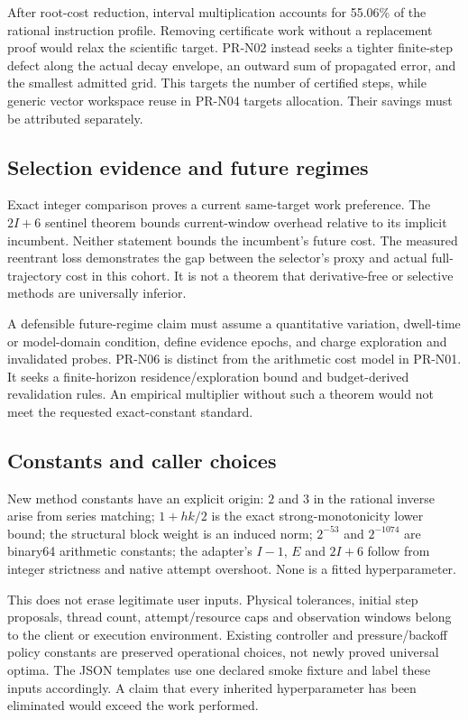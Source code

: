 \documentclass[aps,pra,reprint,onecolumn,12pt,notitlepage,superscriptaddress,nofootinbib]{revtex4-2}
\begin{document}
After root-cost reduction, interval multiplication accounts for 55.06\%
of the rational instruction profile. Removing certificate work without a
replacement proof would relax the scientific target. PR-N02 instead seeks
a tighter finite-step defect along the actual decay envelope, an outward
sum of propagated error, and the smallest admitted grid. This targets
the number of certified steps, while generic vector workspace reuse in
PR-N04 targets allocation. Their savings must be attributed separately.

\subsection{Selection evidence and future regimes}
Exact integer comparison proves a current same-target work preference.
The $2I+6$ sentinel theorem bounds current-window overhead relative to its
implicit incumbent. Neither statement bounds the incumbent's future cost.
The measured reentrant loss demonstrates the gap between the selector's
proxy and actual full-trajectory cost in this cohort. It is not a theorem
that derivative-free or selective methods are universally inferior.

A defensible future-regime claim must assume a quantitative variation,
dwell-time or model-domain condition, define evidence epochs, and charge
exploration and invalidated probes. PR-N06 is distinct from the arithmetic
cost model in PR-N01. It seeks a finite-horizon residence/exploration bound
and budget-derived revalidation rules. An empirical multiplier without
such a theorem would not meet the requested exact-constant standard.

\subsection{Constants and caller choices}
New method constants have an explicit origin: $2$ and $3$ in the rational
inverse arise from series matching; $1+hk/2$ is the exact strong-monotonicity
lower bound; the structural block weight is an induced norm; $2^{-53}$ and
$2^{-1074}$ are binary64 arithmetic constants; the adapter's $I-1$, $E$ and
$2I+6$ follow from integer strictness and native attempt overshoot. None is
a fitted hyperparameter.

This does not erase legitimate user inputs. Physical tolerances, initial
step proposals, thread count, attempt/resource caps and observation windows
belong to the client or execution environment. Existing controller and
pressure/backoff policy constants are preserved operational choices, not
newly proved universal optima. The JSON templates use one declared smoke
fixture and label these inputs accordingly. A claim that every inherited
hyperparameter has been eliminated would exceed the work performed.
\end{document}
